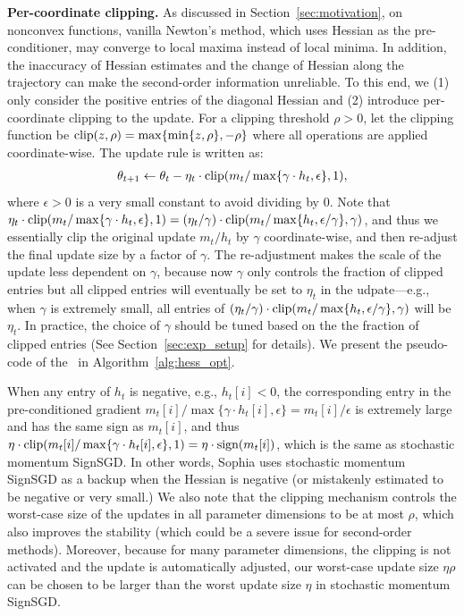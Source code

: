 \textbf{Per-coordinate clipping.} As discussed in Section~\ref{sec:motivation}, on nonconvex functions, vanilla Newton's method, which uses Hessian as the pre-conditioner, may converge to local maxima instead of local minima. In addition, the inaccuracy of Hessian estimates and the change of Hessian along the trajectory can make the second-order information unreliable. To this end, we (1) only consider the positive entries of the diagonal Hessian and (2) introduce per-coordinate clipping to the update. For a clipping threshold $\rho > 0$, let the clipping function be $\textup{clip}(z,\rho) = \max\{\min\{z,\rho\},-\rho\}$ where all operations are applied coordinate-wise. The update rule is written as: 
\begin{align}
    \theta_{t+1} \leftarrow  \theta_{t} - \eta_t \cdot \textup{clip}(m_t / \max\{\gamma \cdot h_t,\epsilon\}, 1),
\end{align}
where $\epsilon > 0$ is a very small constant to avoid dividing by $0$. Note that $\eta_t \cdot \textup{clip}(m_t / \max\{\gamma \cdot h_t,\epsilon\}, 1) = \left(\eta_t/\gamma\right) \cdot \textup{clip}(m_t / \max\{h_t,\epsilon/\gamma\}, \gamma)$, and thus we essentially clip the original update $m_t/h_t$ by $\gamma$ coordinate-wise, and then re-adjust the final update size by a factor of $\gamma$. The re-adjustment makes the scale of the update less dependent on $\gamma$, because now $\gamma$ only controls the fraction of clipped entries but all clipped entries will eventually be set to $\eta_t$ in the udpate---e.g., when $\gamma$ is extremely small, all entries of $\left(\eta_t/\gamma\right) \cdot \textup{clip}(m_t / \max\{h_t,\epsilon/\gamma\}, \gamma)$ will be $\eta_t$. In practice, the choice of $\gamma$ should be tuned based on the the fraction of clipped entries (See Section~\ref{sec:exp_setup} for details). 
We present the pseudo-code of the \ours~in Algorithm~\ref{alg:hess_opt}.

When any entry of $h_t$ is negative, e.g., $h_t[i] < 0$, the corresponding entry in the pre-conditioned gradient $m_t[i]/\max\{\gamma \cdot h_t[i],\epsilon\} = m_t[i]/\epsilon$ is extremely large and has the same sign as $m_t[i]$, and thus $\eta\cdot \textup{clip}(m_t[i] / \max\{\gamma\cdot h_t[i],\epsilon\},1) = \eta\cdot \textup{sign}(m_t[i])$, which is the same as stochastic momentum SignSGD.
In other words, Sophia uses stochastic momentum SignSGD as a backup when the Hessian is negative (or mistakenly estimated to be negative or very small.)  We also note that the clipping mechanism controls the worst-case size of the updates in all parameter dimensions to be at most $\rho$, which also improves the stability (which could be a severe issue for second-order methods). Moreover, because for many parameter dimensions, the clipping is not activated and the update is automatically adjusted, our worst-case update size $\eta\rho$ can be chosen to be larger than the worst update size $\eta$ in stochastic momentum SignSGD. 


